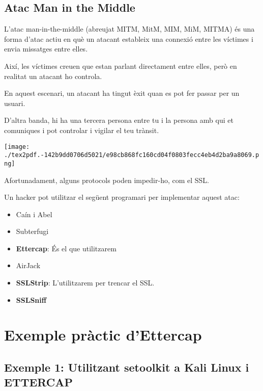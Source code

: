 \documentclass[]{article}
\begin{document}
\hypertarget{atac-man-in-the-middle}{%
\subsection{\texorpdfstring{\textbf{Atac Man in the
Middle}}{Atac Man in the Middle}}\label{atac-man-in-the-middle}}

L'atac man-in-the-middle (abreujat MITM, MitM, MIM, MiM, MITMA) és una
forma d'atac actiu en què un atacant estableix una connexió entre les
víctimes i envia missatges entre elles.

Així, les víctimes creuen que estan parlant directament entre elles,
però en realitat un atacant ho controla.

En aquest escenari, un atacant ha tingut èxit quan es pot fer passar per
un usuari.

D'altra banda, hi ha una tercera persona entre tu i la persona amb qui
et comuniques i pot controlar i vigilar el teu trànsit.

\texttt{[image: ./tex2pdf.-142b9dd0706d5021/e98cb868fc160cd04f0803fecc4eb4d2ba9a8069.png]}

Afortunadament, alguns protocols poden impedir-ho, com el SSL.

Un hacker pot utilitzar el següent programari per implementar aquest
atac:

\begin{itemize}
\item
  Caín i Abel
\item
  Subterfugi
\item
  \textbf{Ettercap}: És el que utilitzarem
\item
  AirJack
\item
  \textbf{SSLStrip}: L'utilitzarem per trencar el SSL.
\item
  \textbf{SSLSniff}
\end{itemize}

\hypertarget{exemple-pruxe0ctic-dettercap}{%
\section{\texorpdfstring{\textbf{Exemple pràctic
d'Ettercap}}{Exemple pràctic d'Ettercap}}\label{exemple-pruxe0ctic-dettercap}}

\hypertarget{exemple-1-utilitzant-setoolkit-a-kali-linux-i-ettercap}{%
\subsection{\texorpdfstring{\textbf{Exemple 1: Utilitzant
\textbf{setoolkit} a Kali Linux i
ETTERCAP}}{Exemple 1: Utilitzant setoolkit a Kali Linux i ETTERCAP}}\label{exemple-1-utilitzant-setoolkit-a-kali-linux-i-ettercap}}
\end{document}
